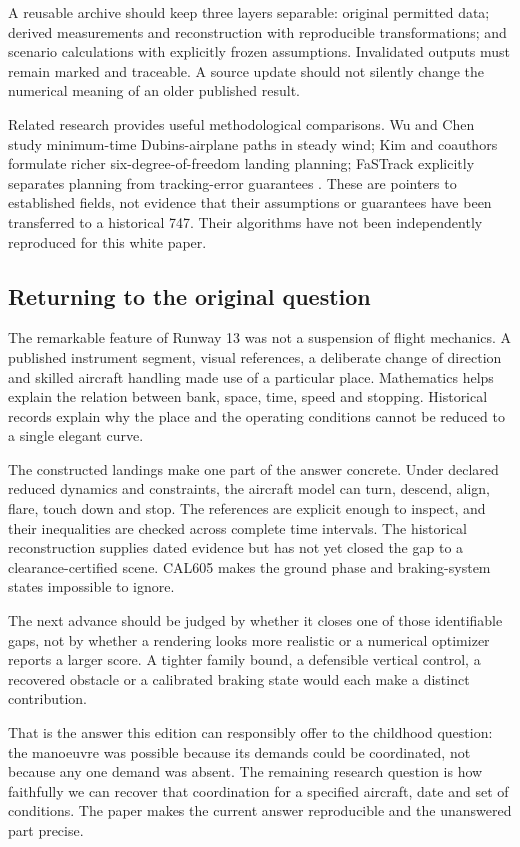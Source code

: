 A reusable archive should keep three layers separable: original permitted data; derived measurements and reconstruction with reproducible transformations; and scenario calculations with explicitly frozen assumptions. Invalidated outputs must remain marked and traceable. A source update should not silently change the numerical meaning of an older published result.

Related research provides useful methodological comparisons. Wu and Chen study minimum-time Dubins-airplane paths in steady wind; Kim and coauthors formulate richer six-degree-of-freedom landing planning; FaSTrack explicitly separates planning from tracking-error guarantees \citep{wu,kim,fastrack}. These are pointers to established fields, not evidence that their assumptions or guarantees have been transferred to a historical 747. Their algorithms have not been independently reproduced for this white paper.

\subsection*{Returning to the original question}
The remarkable feature of Runway 13 was not a suspension of flight mechanics. A published instrument segment, visual references, a deliberate change of direction and skilled aircraft handling made use of a particular place. Mathematics helps explain the relation between bank, space, time, speed and stopping. Historical records explain why the place and the operating conditions cannot be reduced to a single elegant curve.

The constructed landings make one part of the answer concrete. Under declared reduced dynamics and constraints, the aircraft model can turn, descend, align, flare, touch down and stop. The references are explicit enough to inspect, and their inequalities are checked across complete time intervals. The historical reconstruction supplies dated evidence but has not yet closed the gap to a clearance-certified scene. CAL605 makes the ground phase and braking-system states impossible to ignore.

The next advance should be judged by whether it closes one of those identifiable gaps, not by whether a rendering looks more realistic or a numerical optimizer reports a larger score. A tighter family bound, a defensible vertical control, a recovered obstacle or a calibrated braking state would each make a distinct contribution.

That is the answer this edition can responsibly offer to the childhood question: the manoeuvre was possible because its demands could be coordinated, not because any one demand was absent. The remaining research question is how faithfully we can recover that coordination for a specified aircraft, date and set of conditions. The paper makes the current answer reproducible and the unanswered part precise.

